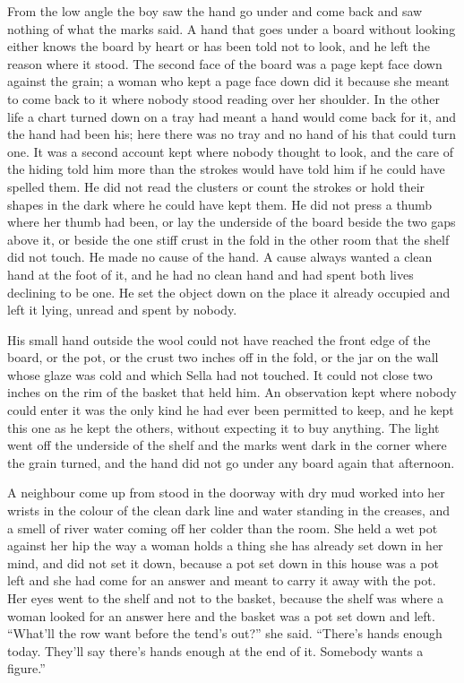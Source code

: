 From the low angle the boy saw the hand go under and come back and saw nothing of what the marks said. A hand that goes under a board without looking either knows the board by heart or has been told not to look, and he left the reason where it stood. The second face of the board was a page kept face down against the grain; a woman who kept a page face down did it because she meant to come back to it where nobody stood reading over her shoulder. In the other life a chart turned down on a tray had meant a hand would come back for it, and the hand had been his; here there was no tray and no hand of his that could turn one. It was a second account kept where nobody thought to look, and the care of the hiding told him more than the strokes would have told him if he could have spelled them. He did not read the clusters or count the strokes or hold their shapes in the dark where he could have kept them. He did not press a thumb where her thumb had been, or lay the underside of the board beside the two gaps above it, or beside the one stiff crust in the fold in the other room that the shelf did not touch. He made no cause of the hand. A cause always wanted a clean hand at the foot of it, and he had no clean hand and had spent both lives declining to be one. He set the object down on the place it already occupied and left it lying, unread and spent by nobody.

His small hand outside the wool could not have reached the front edge of the board, or the pot, or the crust two inches off in the fold, or the jar on the wall whose glaze was cold and which Sella had not touched. It could not close two inches on the rim of the basket that held him. An observation kept where nobody could enter it was the only kind he had ever been permitted to keep, and he kept this one as he kept the others, without expecting it to buy anything. The light went off the underside of the shelf and the marks went dark in the corner where the grain turned, and the hand did not go under any board again that afternoon.

\scenebreak

A neighbour come up from  stood in the doorway with dry mud worked into her wrists in the colour of the clean dark line and water standing in the creases, and a smell of river water coming off her colder than the room. She held a wet pot against her hip the way a woman holds a thing she has already set down in her mind, and did not set it down, because a pot set down in this house was a pot left and she had come for an answer and meant to carry it away with the pot. Her eyes went to the shelf and not to the basket, because the shelf was where a woman looked for an answer here and the basket was a pot set down and left. “What'll the row want before the tend's out?” she said. “There's hands enough today. They'll say there's hands enough at the end of it. Somebody wants a figure.”

